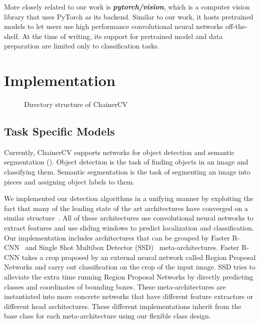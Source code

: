 \documentclass[sigconf]{acmart}
\begin{document}
More closely related to our work is \textbf{\it pytorch/vision}, which is a computer vision library that uses PyTorch as its backend.
Similar to our work, it hosts pretrained models to let users use high performance convolutional neural networks off-the-shelf.
At the time of writing, its support for pretrained model and data preparation are limited only to classification tasks.



\section{Implementation}
\begin{figure}[t]
\caption{Directory structure of ChainerCV}
\label{fig:directory}
\end{figure}
\subsection{Task Specific Models}
Currently, ChainerCV supports networks for object detection and semantic segmentation ().
Object detection is the task of finding objects in an image and classifying them.
Semantic segmentation is the task of segmenting an image into pieces and assigning object labels to them.

We implemented our detection algorithms in a unifying manner by exploiting the fact that many of the leading state of the art architectures have converged on a similar structure~\cite{Huang2016}.
All of these architectures use convolutional neural networks to extract features and use sliding windows to predict localization and classification.
Our implementation includes architectures that can be grouped by Faster R-CNN~\cite{Ren2015} and Single Shot Multibox Detector (SSD)~\cite{Liu} meta-architectures.
Faster R-CNN takes a crop proposed by an external neural network called Region Proposal Networks and carry out classification on the crop of the input image.
SSD tries to alleviate the extra time running Region Proposal Networks by directly predicting classes and coordinates of bounding boxes. These meta-architectures are instantiated into more concrete networks that have different feature extractors or different head architectures.
These different implementations inherit from the base class for each meta-architecture using our flexible class design.
\end{document}
